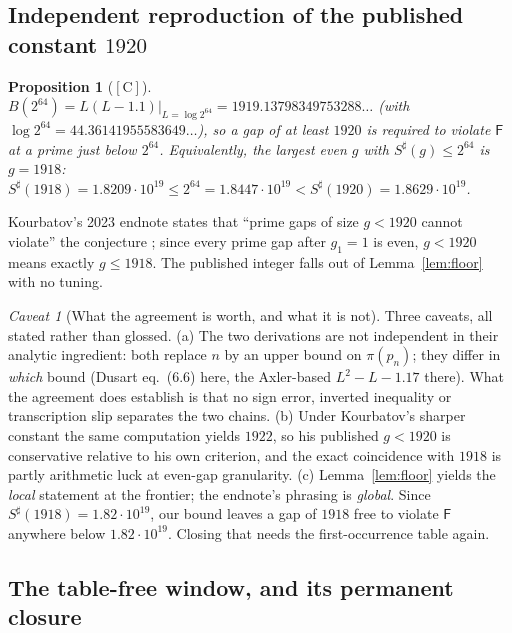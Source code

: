 \documentclass[11pt,a4paper]{article}
\theoremstyle{plain}
\newtheorem{proposition}[theorem]{Proposition}
\theoremstyle{definition}
\theoremstyle{remark}
\newtheorem{hazard}[theorem]{Caveat}
\newcommand{\cC}{{[\mathrm{C}]}}
\newcommand{\Fb}{\mathsf{F}}
\begin{document}
\subsection{Independent reproduction of the published constant $1920$}

\begin{proposition}[$\cC$]
\label{prop:1920}
$B(2^{64}) = L(L-1.1)\bigr|_{L = \log 2^{64}} = 1919.13798349753288\ldots$ (with
$\log 2^{64} = 44.36141955583649\ldots$), so a gap of at least $1920$ is required to violate
$\Fb$ at a prime just below $2^{64}$. Equivalently, the largest even $g$ with
$S^\sharp(g) \le 2^{64}$ is $g = 1918$:
$S^\sharp(1918) = 1.8209\cdot10^{19} \le 2^{64} = 1.8447\cdot10^{19} < S^\sharp(1920) =
1.8629\cdot10^{19}$.
\end{proposition}

Kourbatov's 2023 endnote states that ``prime gaps of size $g < 1920$ cannot violate''
the conjecture \cite{kourbatov2015verification}; since every prime gap after $g_1 = 1$ is
even, $g < 1920$ means exactly $g \le 1918$. The published integer falls out of
Lemma~\ref{lem:floor} with no tuning.

\begin{hazard}[What the agreement is worth, and what it is not]
\label{haz:1920}
Three caveats, all stated rather than glossed.
(a) The two derivations are not independent in their analytic ingredient: both replace $n$ by
an upper bound on $\pi(p_n)$; they differ in \emph{which} bound (Dusart eq.~(6.6) here, the
Axler-based $L^2 - L - 1.17$ there). What the agreement does establish is that no sign error,
inverted inequality or transcription slip separates the two chains.
(b) Under Kourbatov's sharper constant the same computation yields $1922$, so his published
$g < 1920$ is conservative relative to his own criterion, and the exact coincidence with
$1918$ is partly arithmetic luck at even-gap granularity.
(c) Lemma~\ref{lem:floor} yields the \emph{local} statement at the frontier; the endnote's
phrasing is \emph{global}. Since $S^\sharp(1918) = 1.82\cdot10^{19}$, our bound leaves a gap
of $1918$ free to violate $\Fb$ anywhere below $1.82\cdot10^{19}$. Closing that needs the
first-occurrence table again.
\end{hazard}

\subsection{The table-free window, and its permanent closure}
\end{document}
